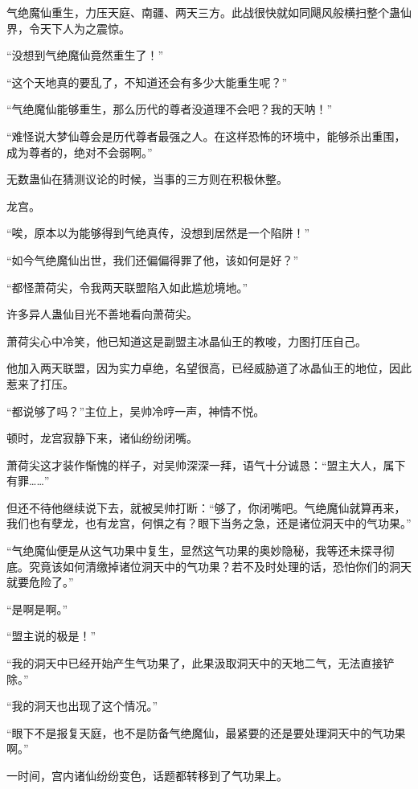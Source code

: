 
\begin{this_body}

气绝魔仙重生，力压天庭、南疆、两天三方。此战很快就如同飓风般横扫整个蛊仙界，令天下人为之震惊。

“没想到气绝魔仙竟然重生了！”

“这个天地真的要乱了，不知道还会有多少大能重生呢？”

“气绝魔仙能够重生，那么历代的尊者没道理不会吧？我的天呐！”

“难怪说大梦仙尊会是历代尊者最强之人。在这样恐怖的环境中，能够杀出重围，成为尊者的，绝对不会弱啊。”

无数蛊仙在猜测议论的时候，当事的三方则在积极休整。

龙宫。

“唉，原本以为能够得到气绝真传，没想到居然是一个陷阱！”

“如今气绝魔仙出世，我们还偏偏得罪了他，该如何是好？”

“都怪萧荷尖，令我两天联盟陷入如此尴尬境地。”

许多异人蛊仙目光不善地看向萧荷尖。

萧荷尖心中冷笑，他已知道这是副盟主冰晶仙王的教唆，力图打压自己。

他加入两天联盟，因为实力卓绝，名望很高，已经威胁道了冰晶仙王的地位，因此惹来了打压。

“都说够了吗？”主位上，吴帅冷哼一声，神情不悦。

顿时，龙宫寂静下来，诸仙纷纷闭嘴。

萧荷尖这才装作惭愧的样子，对吴帅深深一拜，语气十分诚恳：“盟主大人，属下有罪……”

但还不待他继续说下去，就被吴帅打断：“够了，你闭嘴吧。气绝魔仙就算再来，我们也有孽龙，也有龙宫，何惧之有？眼下当务之急，还是诸位洞天中的气功果。”

“气绝魔仙便是从这气功果中复生，显然这气功果的奥妙隐秘，我等还未探寻彻底。究竟该如何清缴掉诸位洞天中的气功果？若不及时处理的话，恐怕你们的洞天就要危险了。”

“是啊是啊。”

“盟主说的极是！”

“我的洞天中已经开始产生气功果了，此果汲取洞天中的天地二气，无法直接铲除。”

“我的洞天也出现了这个情况。”

“眼下不是报复天庭，也不是防备气绝魔仙，最紧要的还是要处理洞天中的气功果啊。”

一时间，宫内诸仙纷纷变色，话题都转移到了气功果上。


\end{this_body}
